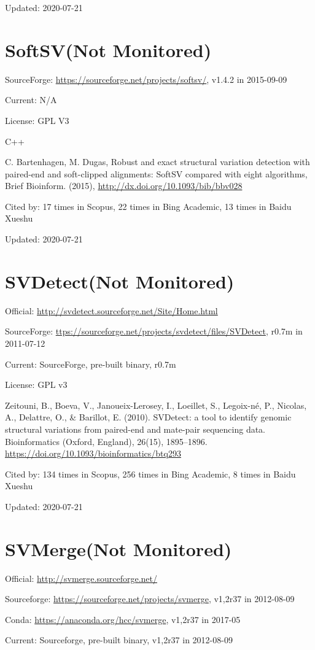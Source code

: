 \documentclass[]{article}
\newcommand{\nm}{{\color{red}(Not Monitored)}}
\newcommand{\cb}[3]{\par Cited by: {\color{blue}\Huge #1} times in Scopus, {\color{blue}\Huge #2} times in Bing Academic, {\color{blue}\Huge #3} times in Baidu Xueshu}
\begin{document}
Updated: 2020-07-21

\section{SoftSV\nm}

SourceForge: \url{https://sourceforge.net/projects/softsv/}, v1.4.2 in 2015-09-09

Current: N/A

License: GPL V3

C++

C. Bartenhagen, M. Dugas, Robust and exact structural variation detection with paired-end and soft-clipped alignments: SoftSV compared with eight algorithms, Brief Bioinform. (2015), \url{http://dx.doi.org/10.1093/bib/bbv028}\cb{17}{22}{13}

Updated: 2020-07-21

\section{SVDetect\nm}

Official: \url{http://svdetect.sourceforge.net/Site/Home.html}

SourceForge: \url{ttps://sourceforge.net/projects/svdetect/files/SVDetect}, r0.7m in 2011-07-12

Current: SourceForge, pre-built binary, r0.7m

License: GPL v3

Zeitouni, B., Boeva, V., Janoueix-Lerosey, I., Loeillet, S., Legoix-né, P., Nicolas, A., Delattre, O., \& Barillot, E. (2010). SVDetect: a tool to identify genomic structural variations from paired-end and mate-pair sequencing data. Bioinformatics (Oxford, England), 26(15), 1895–1896. \url{https://doi.org/10.1093/bioinformatics/btq293}\cb{134}{256}{8}

Updated: 2020-07-21

\section{SVMerge\nm}

Official: \url{http://svmerge.sourceforge.net/}

Sourceforge: \url{https://sourceforge.net/projects/svmerge}, v1,2r37 in 2012-08-09

Conda: \url{https://anaconda.org/hcc/svmerge}, v1,2r37 in 2017-05

Current: Sourceforge, pre-built binary, v1,2r37 in 2012-08-09
\end{document}
